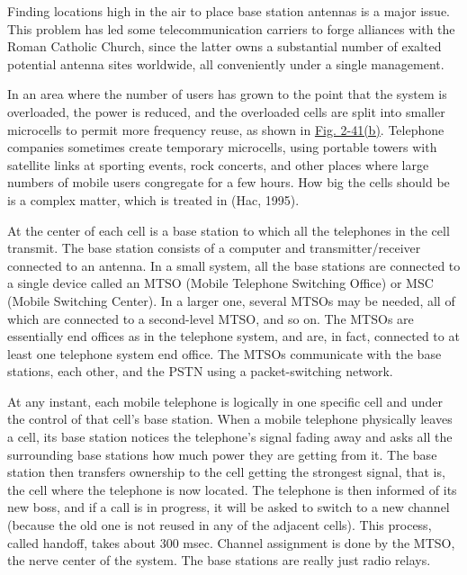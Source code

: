 \documentclass[b5paper,11pt]{memoir}
\begin{document}

Finding locations high in the air to place base station antennas is a
major issue. This problem has led some telecommunication carriers to
forge alliances with the Roman Catholic Church, since the latter owns a
substantial number of exalted potential antenna sites worldwide, all
conveniently under a single management.

In an area where the number of users has grown to the point that the
system is overloaded, the power is reduced, and the overloaded cells are
split into smaller {microcells} to permit more frequency reuse, as shown
in
\protect\hyperlink{0130661023_ch02lev1sec6.htmlux5cux23ch02fig41}{Fig.
2-41(b)}. Telephone companies sometimes create temporary microcells,
using portable towers with satellite links at sporting events, rock
concerts, and other places where large numbers of mobile users
congregate for a few hours. How big the cells should be is a complex
matter, which is treated in (Hac, 1995).

At the center of each cell is a base station to which all the telephones
in the cell transmit. The base station consists of a computer and
transmitter/receiver connected to an antenna. In a small system, all the
base stations are connected to a single device called an {MTSO} ({Mobile
Telephone Switching Office}) or {MSC} ({Mobile Switching Center}). In a
larger one, several MTSOs may be needed, all of which are connected to a
second-level MTSO, and so on. The MTSOs are essentially end offices as
in the telephone system, and are, in fact, connected to at least one
telephone system end office. The MTSOs communicate with the base
stations, each other, and the PSTN using a packet-switching network.

At any instant, each mobile telephone is logically in one specific cell
and under the control of that cell's base station. When a mobile
telephone physically leaves a cell, its base station notices the
telephone's signal fading away and asks all the surrounding base
stations how much power they are getting from it. The base station then
transfers ownership to the cell getting the strongest signal, that is,
the cell where the telephone is now located. The telephone is then
informed of its new boss, and if a call is in progress, it will be asked
to switch to a new channel (because the old one is not reused in any of
the adjacent cells). This process, called {handoff}, takes about 300
msec. Channel assignment is done by the MTSO, the nerve center of the
system. The base stations are really just radio relays.
\end{document}
